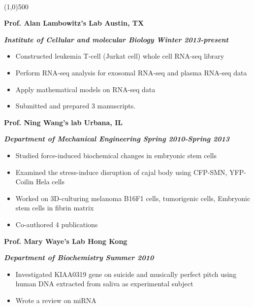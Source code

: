 \documentclass[dvips,11pt]{article}
\begin{document}
 \vspace{-2mm}
\\\noindent \line(1,0){500}\\
\vspace{-5mm}

\noindent \centerline{\bf Prof. Alan Lambowitz's Lab \hfill	Austin, TX}
\noindent \centerline{\textit{\textbf{Institute of Cellular and molecular Biology \hfill Winter 2013-present}}}
\vspace{-2mm}
\begin{itemize} \itemsep1pt \parskip0pt 
	\setlength{\itemsep}{0pt}
	\item Constructed leukemia T-cell (Jurkat cell) whole cell RNA-seq library
	\item Perform RNA-seq analysis for exosomal RNA-seq and plasma RNA-seq data
	\item Apply mathematical models on RNA-seq data
	\item Submitted and prepared 3 manuscripts.
\end{itemize}

\noindent \centerline{\bf Prof. Ning Wang's lab \hfill Urbana, IL}
\noindent \centerline{\bf{\textit{Department of Mechanical Engineering \hfill Spring 2010-Spring 2013} }}
\vspace{-2mm}
\begin{itemize} \itemsep1pt \parskip0pt 
	\setlength{\itemsep}{0pt}
	\item Studied force-induced biochemical changes in embryonic stem cells
	\item Examined the stress-induce disruption of cajal body using CFP-SMN, YFP-Coilin Hela cells
	\item Worked on 3D-culturing melanoma B16F1 cells, tumorigenic cells, Embryonic stem cells in fibrin matrix 
	\item Co-authored 4 publications
\end{itemize}

\noindent\centerline{\bf Prof. Mary Waye's Lab \hfill	Hong Kong}
\noindent\centerline{\textbf{\textit{Department of Biochemistry \hfill Summer 2010}}}
\vspace{-2mm}
\begin{itemize} \itemsep1pt \parskip0pt 
	\setlength{\itemsep}{0pt}
	\item Investigated KIAA0319 gene on suicide and musically perfect pitch using human DNA extracted from saliva as experimental subject 
	\item Wrote a review on miRNA
\end{itemize}
\smallskip 
\end{document}
